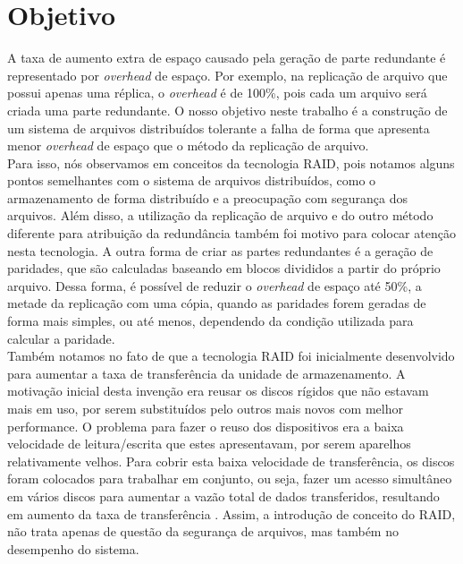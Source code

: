 
\section{Objetivo}

A taxa de aumento extra de espaço causado pela geração de parte redundante é representado por \textit{overhead} de espaço.
Por exemplo, na replicação de arquivo que possui apenas uma réplica, o \textit{overhead} é de 100\%, pois cada um arquivo será criada uma parte redundante.
O nosso objetivo neste trabalho é a construção de um sistema de arquivos distribuídos tolerante a falha de forma que apresenta menor \textit{overhead} de espaço que o método da replicação de arquivo.
\\

Para isso, nós observamos em conceitos da tecnologia RAID, pois notamos alguns pontos semelhantes com o sistema de arquivos distribuídos, como o armazenamento de forma distribuído e a preocupação com segurança dos arquivos.
Além disso, a utilização da replicação de arquivo e do outro método diferente para atribuição da redundância também foi motivo para colocar atenção nesta tecnologia.
A outra forma de criar as partes redundantes é a geração de paridades, que são calculadas baseando em blocos divididos a partir do próprio arquivo.
Dessa forma, é possível de reduzir o \textit{overhead} de espaço até 50\%, a metade da replicação com uma cópia, quando as paridades forem geradas de forma mais simples, ou até menos, dependendo da condição utilizada para calcular a paridade.
\\

Também notamos no fato de que a tecnologia RAID foi inicialmente desenvolvido para aumentar a taxa de transferência da unidade de armazenamento.
A motivação inicial desta invenção era reusar os discos rígidos que não estavam mais em uso, por serem substituídos pelo outros mais novos com melhor performance.
O problema para fazer o reuso dos dispositivos era a baixa velocidade de leitura/escrita que estes apresentavam, por serem aparelhos relativamente velhos. 
Para cobrir esta baixa velocidade de transferência, os discos foram colocados para trabalhar em conjunto, ou seja, fazer um acesso simultâneo em vários discos para aumentar a vazão total de dados transferidos, resultando em aumento da taxa de transferência .
Assim, a introdução de conceito do RAID, não trata apenas de questão da segurança de arquivos, mas também no desempenho do sistema.  
\\

